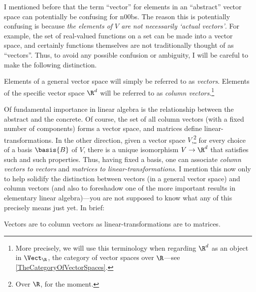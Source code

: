 I mentioned before that the term ``vector'' for elements in an ``abstract'' vector space can potentially be confusing for n00bs.  The reason this is potentially confusing is because \emph{the elements of $V$ are not necessarily `actual vectors'}.  For example, the set of real-valued functions on a set can be made into a vector space, and certainly functions themselves are not traditionally thought of as ``vectors''.  Thus, to avoid any possible confusion or ambiguity, I will be careful to make the following distinction.
\begin{displayquote}
	Elements of a general vector space will simply be referred to as \emph{vectors}.  Elements of the specific vector space $\R ^d$ will be referred to as \emph{column vectors}.\footnote{More precisely, we will use this terminology when regarding $\R ^d$ as an object in $\Vect _{\R}$, the category of vector spaces over $\R$---see \cref{TheCategoryOfVectorSpaces}.}
\end{displayquote}

Of fundamental importance in linear algebra is the relationship between the abstract and the concrete.  Of course, the set of all column vectors (with a fixed number of components) forms a vector space, and matrices define linear-transformations.  In the other direction, given a vector space $V$,\footnote{Over $\R$, for the moment.} for every choice of a basis $\basis{B}$ of $V$, there is a unique isomorphism $V\rightarrow \R ^d$ that satisfies such and such properties.  Thus, having fixed a basis, one can associate \emph{column vectors to vectors} and \emph{matrices to linear-transformations}.  I mention this now only to help solidify the distinction between vectors (in a general vector space) and column vectors (and also to foreshadow one of the more important results in elementary linear algebra)---you are not supposed to know what any of this precisely means just yet.  In brief:
\begin{displayquote}
	Vectors are to column vectors as linear-transformations are to matrices.
\end{displayquote}

